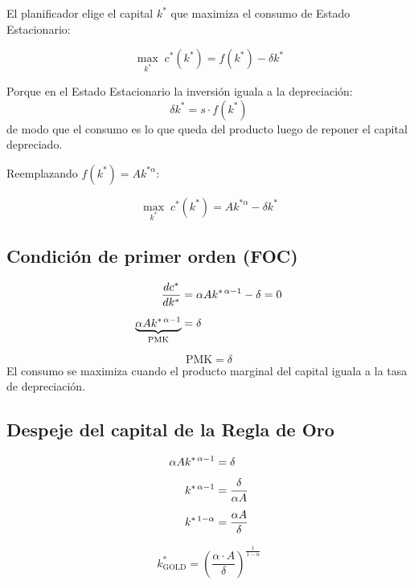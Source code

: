 \documentclass[11pt,a4paper]{article}
\begin{document}
El planificador elige el capital $k^{*}$ que maximiza el consumo de Estado Estacionario:

\[
\max_{k^{*}} \; c^{*}(k^{*}) = f(k^{*}) - \delta k^{*}
\]

\begin{notabox}
Porque en el Estado Estacionario la inversión iguala a la depreciación:
\[
\delta k^{*} = s \cdot f(k^{*})
\]
de modo que el consumo es lo que queda del producto luego de reponer el capital depreciado.
\end{notabox}

Reemplazando $f(k^{*}) = A k^{*\alpha}$:

\[
\max_{k^{*}} \; c^{*}(k^{*}) = A k^{*\alpha} - \delta k^{*}
\]

\subsection{Condición de primer orden (FOC)}

\begin{align}
    \frac{d c^{*}}{d k^{*}} &= \alpha A k^{*\,\alpha-1} - \delta = 0 \notag \\[6pt]
    \underbrace{\alpha A k^{*\,\alpha-1}}_{\text{PMK}} &= \delta
\end{align}

\begin{resultadobox}
\begin{equation}
    \text{PMK} = \delta
\end{equation}
El consumo se maximiza cuando el producto marginal del capital iguala a la tasa de depreciación.
\end{resultadobox}

\subsection{Despeje del capital de la Regla de Oro}

\begin{align}
    \alpha A k^{*\,\alpha-1} &= \delta \notag \\[4pt]
    k^{*\,\alpha-1} &= \frac{\delta}{\alpha A} \notag \\[4pt]
    k^{*\,1-\alpha} &= \frac{\alpha A}{\delta}
\end{align}

\begin{resultadobox}
\begin{equation}
    k^{*}_{\text{GOLD}} = \left(\frac{\alpha \cdot A}{\delta}\right)^{\frac{1}{1-\alpha}}
\end{equation}
\end{resultadobox}
\end{document}
